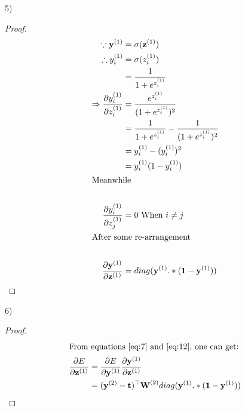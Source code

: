\documentclass[letterpaper, 11pt]{article}
\begin{document}
5)
\begin{proof}
    \begin{align}
        \because\textbf{y}^{(1)}                                  & = \sigma(\textbf{z}^{(1)})                                          \\
        \therefore y_i^{(1)}                                      & = \sigma(z_i^{(1)})\nonumber                                        \\
                                                                  & =\frac{1}{1+e^{z_i^{(1)}}}                                          \\
        \Rightarrow
        \frac{\partial{y_i^{(1)}}}{\partial{z_i^{(1)}}}
                                                                  & =\frac{e^{z_i^{(1)}}}{(1+e^{z_i^{(1)}})^2}\nonumber                 \\
                                                                  & =\frac{1}{1+e^{z_i^{(1)}}} - \frac{1}{(1+e^{z_i^{(1)}})^2}\nonumber \\
                                                                  & =y_i^{(1)} - (y_i^{(1)})^2\nonumber                                 \\
                                                                  & =y_i^{(1)} (1-y_i^{(1)} )                                           \\
        \intertext{Meanwhile}\nonumber                                                                                                  \\
        \frac{\partial{y_i^{(1)}}}{\partial{z_j^{(1)}}}           & =0 \ \text{When $i\neq j$}                                          \\
        \intertext{After some re-arrangement}\nonumber                                                                                  \\
        \frac{\partial\textbf{y}^{(1)}}{\partial\textbf{z}^{(1)}} & =
        diag(\textbf{y}^{(1)}.*(\textbf{1}-\textbf{y}^{(1)}))\label{eq:12}
    \end{align}
\end{proof}
6)
\begin{proof}
    \begin{align*}
        \intertext{From equations \eqref{eq:7} and \eqref{eq:12}, one can get:}
        \frac{\partial E}{\partial \textbf{z}^{(1)}} & =
        \frac{\partial E}{\partial \textbf{y}^{(1)}}
        \frac{\partial \textbf{y}^{(1)}}{\partial \textbf{z}^{(1)}}                                                                                               \\
                                                     & =(\textbf{y}^{(2)} - \textbf{t})^\top\textbf{W}^{(2)}diag(\textbf{y}^{(1)}.*(\textbf{1}-\textbf{y}^{(1)}))
    \end{align*}
\end{proof}
\end{document}
